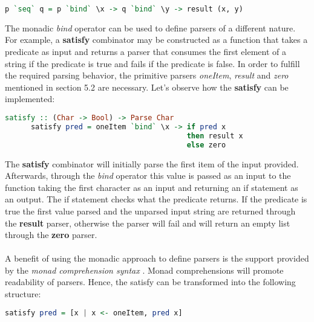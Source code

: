 \documentclass[a4paper, onecolumn]{article}
\begin{document}
    \begin{tcolorbox}
    \begin{lstlisting}[language=Haskell]
      p `seq` q = p `bind` \x -> q `bind` \y -> result (x, y)
    \end{lstlisting}
    \end{tcolorbox}
    
    The monadic \textit{bind} operator can be used to define parsers of a different nature. For example, a \textbf{satisfy} combinator may be constructed as a function that takes a predicate as input and returns a parser that consumes the first element of a string if the predicate is true and fails if the predicate is false. In order to fulfill the required parsing behavior, the primitive parsers \textit{oneItem}, \textit{result} and \textit{zero} mentioned in section 5.2 are necessary. Let's observe how the \textbf{satisfy} can be implemented: 
    
    \begin{tcolorbox}
    \begin{lstlisting}[language=Haskell]
      satisfy :: (Char -> Bool) -> Parse Char
      satisfy pred = oneItem `bind` \x -> if pred x 
                                          then result x 
                                          else zero
    \end{lstlisting}
    \end{tcolorbox}
    
    The \textbf{satisfy} combinator will initially parse the first item of the input provided. Afterwards, through the \textit{bind} operator this value is passed as an input to the function taking the first character as an input and returning an if statement as an output. The if statement checks what the predicate returns. If the predicate is true the first value parsed and the unparsed input string are returned through the \textbf{result} parser, otherwise the parser will fail and will return an empty list through the \textbf{zero} parser.  \\ \\
    A benefit of using the monadic approach to define parsers is the support provided by the \textit{monad comprehension syntax} \cite{bringMonadComprehension}. Monad comprehensions will promote readability of parsers. Hence, the satisfy can be transformed into the following structure: 
    
    \begin{tcolorbox}
    \begin{lstlisting}[language=Haskell]
      satisfy pred = [x | x <- oneItem, pred x]
    \end{lstlisting}
    \end{tcolorbox}
    
\end{document}
